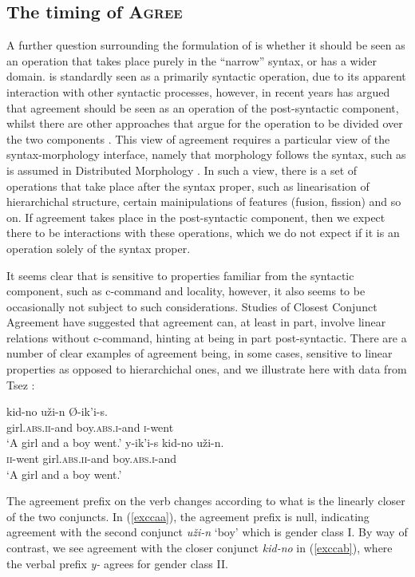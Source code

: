 \documentclass[output=paper
,modfonts
,nonflat]{langsci/langscibook}
\begin{document}
\subsection{The timing of \textsc{Agree}}
\label{sectiming}

A further question surrounding the formulation of \agr{} is whether it should be seen as an operation that takes place purely in the ``narrow'' syntax, or has a wider domain. 
\agr{} is standardly seen as a primarily syntactic operation, due to its apparent interaction with other syntactic processes, however, in recent years \cite{Bobaljik2008} has argued that agreement should be seen as an operation of the post-syntactic component, whilst there are other approaches that argue for the operation to be divided over the two components \citep{benmamounetal2009,bhattwalkow2013,marusicetal2015}.
This view of agreement requires a particular view of the syntax-morphology interface, namely that morphology follows the syntax, such as is assumed in Distributed Morphology \citep{hallemarantz1993,arreginevins2012}.
In such a view, there is a set of operations that take place after the syntax proper, such as linearisation of hierarchichal structure, certain mainipulations of features (fusion, fission) and so on.
If agreement takes place in the post-syntactic component, then we expect there to be interactions with these operations, which we do not expect if it is an operation solely of the syntax proper.

It seems clear that \agr{} is sensitive to properties familiar from the syntactic component, such as c-command and locality, however, it also seems to be occasionally not subject to such considerations. 
Studies of Closest Conjunct Agreement have suggested that agreement can, at least in part, involve linear relations without c-command, hinting at being in part post-syntactic.
There are a number of clear examples of agreement being, in some cases, sensitive to linear properties as opposed to hierarchichal ones, and we illustrate here with data from Tsez \citep{benmamounetal2009}:

\begin{exe}
	\ex
	\begin{xlist}
		\ex
		\gll kid-no u\v{z}i-n \O-ik'i-s.\\
		girl.\textsc{abs.ii}-and boy.\textsc{abs.i}-and \textsc{i}-went\\
		\glt `A girl and a boy went.' \label{exccaa}
		\ex
		\gll y-ik'i-s kid-no u\v{z}i-n.\\
		\textsc{ii}-went girl.\textsc{abs.ii}-and boy.\textsc{abs.i}-and\\
		\glt `A girl and a boy went.' \label{exccab}
	\end{xlist}
\end{exe}
The agreement prefix on the verb changes according to what is the linearly closer of the two conjuncts.
In (\ref{exccaa}), the agreement prefix is null, indicating agreement with the second conjunct \emph{u\v{z}i-n} `boy' which is gender class I.
By way of contrast, we see agreement with the closer conjunct \emph{kid-no} in (\ref{exccab}), where the verbal prefix \emph{y-} agrees for gender class II.
\end{document}
